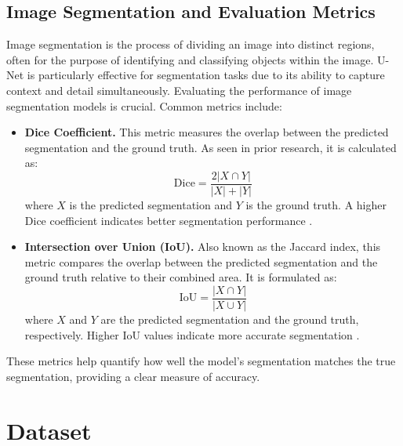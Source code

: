 \documentclass{ieeeaccess}
\begin{document}
\subsection{Image Segmentation and Evaluation Metrics}
Image segmentation is the process of dividing an image into distinct regions, often for the purpose of identifying and classifying objects within the image. U-Net is particularly effective for segmentation tasks due to its ability to capture context and detail simultaneously.
Evaluating the performance of image segmentation models is crucial. Common metrics include:
\begin{itemize}
    \item \textbf{Dice Coefficient.} This metric measures the overlap between the predicted segmentation and the ground truth. As seen in prior research, it is calculated as:
    \[
    \text{Dice} = \frac{2|X \cap Y|}{|X| + |Y|}
    \]
    where \(X\) is the predicted segmentation and \(Y\) is the ground truth. A higher Dice coefficient indicates better segmentation performance \cite{milletari2016v}.
    \item \textbf{Intersection over Union (IoU).} Also known as the Jaccard index, this metric compares the overlap between the predicted segmentation and the ground truth relative to their combined area. It is formulated as:
    \[
    \text{IoU} = \frac{|X \cap Y|}{|X \cup Y|}
    \]
    where \(X\) and \(Y\) are the predicted segmentation and the ground truth, respectively. Higher IoU values indicate more accurate segmentation \cite{rahman2016optimizing}.
\end{itemize}
These metrics help quantify how well the model's segmentation matches the true segmentation, providing a clear measure of accuracy.

\section{Dataset} \label{Sec:dataset}
\end{document}
